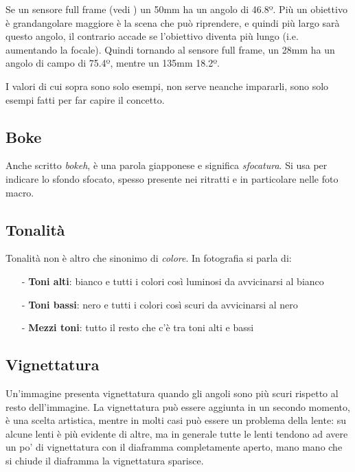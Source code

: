 Se un sensore full frame (vedi ) un 50mm ha un angolo di 46.8º. Più un obiettivo è grandangolare maggiore è la scena che può riprendere, e quindi più largo sarà questo angolo, il contrario accade se l'obiettivo diventa più lungo (i.e. aumentando la focale). Quindi tornando al sensore full frame, un 28mm ha un angolo di campo di 75.4º, mentre un 135mm 18.2º.

I valori di cui sopra sono solo esempi, non serve neanche impararli, sono solo esempi fatti per far capire il concetto.


\subsection{Boke} \label{subsec:boke}
Anche scritto \textit{bokeh}, è una parola giapponese e significa \textit{sfocatura}.\newline
Si usa per indicare lo sfondo sfocato, spesso presente nei ritratti e in particolare nelle foto macro.


\subsection{Tonalità} \label{subsec:tonalita}
Tonalità non è altro che sinonimo di \textit{colore}.\newline
In fotografia si parla di:
\begin{itemize}
    \item[-] \textbf{Toni alti}: bianco e tutti i colori così luminosi da avvicinarsi al bianco
    \item[-] \textbf{Toni bassi}: nero e tutti i colori così scuri da avvicinarsi al nero
    \item[-] \textbf{Mezzi toni}: tutto il resto che c'è tra toni alti e bassi   
\end{itemize}


\subsection{Vignettatura} \label{subsec:vignettatura}
Un'immagine presenta vignettatura quando gli angoli sono più scuri rispetto al resto dell'immagine.
La vignettatura può essere aggiunta in un secondo momento, è una scelta artistica, mentre in molti casi può essere un problema della lente: su alcune lenti è più evidente di altre, ma in generale tutte le lenti
tendono ad avere un po' di vignettatura con il diaframma completamente aperto, mano mano che si chiude il diaframma la vignettatura sparisce.


